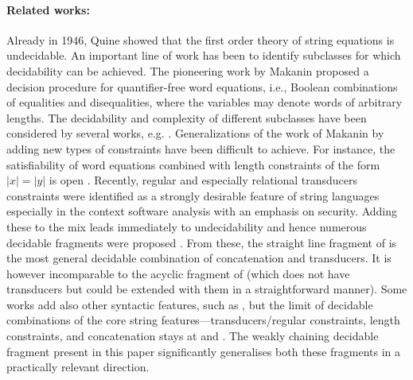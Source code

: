 \documentclass[sigplan,review,anonymous]{acmart}\settopmatter{printfolios=true,printccs=false,printacmref=false}
\begin{document}
\paragraph{Related works:} 
Already in 1946, Quine \cite{Quine46} showed that the first order theory
of string equations is undecidable.
%
An important line of work has been to identify subclasses
for which decidability can be achieved.
%
The pioneering work by Makanin \cite{makanin} proposed a decision
procedure for quantifier-free word equations, i.e., Boolean combinations of
equalities and disequalities, where the variables may denote words of 
arbitrary lengths.
%
The decidability and complexity of different subclasses
have been considered by several works, e.g.
\cite{Plandowski99,Plandowski06,Matiyasevich08,Robson90,Schulz90,Ganesh13decide,DBLP:journals/corr/GaneshB16}.
Generalizations of the work of Makanin by adding
new types of constraints have been difficult to achieve.
%
For instance, the satisfiability of word equations combined with length
constraints of the form $\left|x\right|=\left|y\right|$ is open
\cite{buchi:definability}.
%
Recently, 
regular and especially relational transducers constraints were identified
%
as a strongly desirable feature of string languages 
%
especially in the context software analysis with an emphasis on security. 
%
Adding these to the mix leads immediately to undecidability \cite{morvan}
%
and hence numerous decidable fragments were proposed \cite{string14,BFL13,BL16,Chen:2018,Chen:2019}. 
%
From these, the straight line fragment of \cite{BL16} is the most general decidable combination of concatenation and transducers. It is however incomparable to the acyclic fragment of \cite{string14} (which does not have transducers but could be extended with them in a straightforward manner).
%
Some works add also other syntactic features, such as \cite{Chen:2018,Chen:2019}, 
but the limit of decidable combinations of the core string features---transducers/regular constraints, length constraints, and concatenation stays at \cite{BL16} and \cite{string14}.
%
The weakly chaining decidable fragment present in this paper significantly generalises both these fragments in a practically relevant direction.
\end{document}
